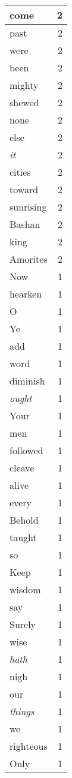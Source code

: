\begin{center}
\begin{longtable}{l|r}
come & 2 \\ \hline
past & 2 \\ \hline
were & 2 \\ \hline
been & 2 \\ \hline
mighty & 2 \\ \hline
shewed & 2 \\ \hline
none & 2 \\ \hline
else & 2 \\ \hline
\emph{it} & 2 \\ \hline
cities & 2 \\ \hline
toward & 2 \\ \hline
sunrising & 2 \\ \hline
Bashan & 2 \\ \hline
king & 2 \\ \hline
Amorites & 2 \\ \hline
Now & 1 \\ \hline
hearken & 1 \\ \hline
O & 1 \\ \hline
Ye & 1 \\ \hline
add & 1 \\ \hline
word & 1 \\ \hline
diminish & 1 \\ \hline
\emph{ought} & 1 \\ \hline
Your & 1 \\ \hline
men & 1 \\ \hline
followed & 1 \\ \hline
cleave & 1 \\ \hline
alive & 1 \\ \hline
every & 1 \\ \hline
Behold & 1 \\ \hline
taught & 1 \\ \hline
so & 1 \\ \hline
Keep & 1 \\ \hline
wisdom & 1 \\ \hline
say & 1 \\ \hline
Surely & 1 \\ \hline
wise & 1 \\ \hline
\emph{hath} & 1 \\ \hline
nigh & 1 \\ \hline
our & 1 \\ \hline
\emph{things} & 1 \\ \hline
we & 1 \\ \hline
righteous & 1 \\ \hline
Only & 1 \\ \hline

\end{longtable}
\end{center}
